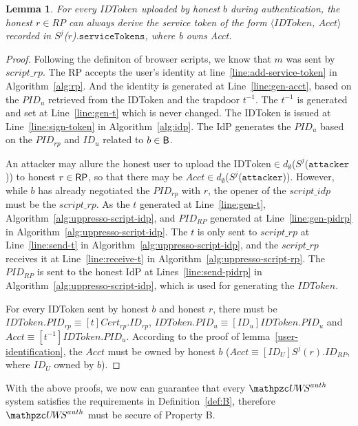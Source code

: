 \documentclass[letterpaper,onecolumn,10pt]{article}
\newtheorem{lemma}{Lemma}
\begin{document}
\begin{lemma}
For every $IDToken$ uploaded by honest $b$ during authentication, the honest $r \in RP$ can always derive the service token of the form $\langle IDToken$, $Acct \rangle$ recorded in $S^j$($r$).$\mathtt{serviceTokens}$, where b owns Acct. 
\end{lemma}
\begin{proof}
  Following the definiton of browser scripts, we know that $m$ was sent by $script\_rp$. 
  The RP accepts the user's identity at line~\ref{line:add-service-token} in Algorithm~\ref{alg:rp}.
  And the identity is generated at Line~\ref{line:gen-acct}, based on the $PID_u$ retrieved 
  from the IDToken and the trapdoor $t^{-1}$. The $t^{-1}$ is generated and set at 
  Line~\ref{line:gen-t} which is never changed. 
  The IDToken is issued at Line~\ref{line:sign-token} in Algorithm~\ref{alg:idp}.
  The IdP generates the $PID_u$ based on the $PID_{rp}$ and $ID_u$ related to $b \in \mathsf{B}$.

  An attacker may allure the honest user to upload the $\text{IDToken} \in d_{\emptyset}$($S^j$($\mathtt{attacker}$)) 
  to honest $r\in\mathsf{RP}$, so that there may be $Acct \in d_{\emptyset}$($S^j$($\mathtt{attacker}$)).
  However, while $b$ has already negotiated the $PID_{rp}$ with $r$, the opener of 
  the $script\_idp$ must be the $script\_rp$. As the $t$ generated at Line~\ref{line:gen-t}, 
  Algorithm~\ref{alg:uppresso-script-idp}, and $PID_{RP}$ generated at Line~\ref{line:gen-pidrp} 
  in Algorithm~\ref{alg:uppresso-script-idp}.
  The $t$ is only sent to $script\_rp$ at Line~\ref{line:send-t} in 
  Algorithm~\ref{alg:uppresso-script-idp}, 
  and the $script\_rp$ receives it at Line~\ref{line:receive-t} in 
  Algorithm~\ref{alg:uppresso-script-rp}.
  The $PID_{RP}$ is sent to the honest IdP at Lines~\ref{line:send-pidrp} in 
  Algorithm~\ref{alg:uppresso-script-idp},  which is used for generating the $IDToken$.

  For every IDToken sent by honest $b$ and honest $r$, there must be 
  $IDToken.PID_{rp} \equiv [t]Cert_{rp}.ID_{rp}$, 
  $IDToken.PID_u \equiv [ID_u]IDToken.PID_u$ and 
  $Acct \equiv [t^{-1}]IDToken.PID_u$. 
  According to the proof of lemma~\ref{user-identification}, 
  the $Acct$ must be owned by honest $b$ ($Acct \equiv [ID_U]S^j(r).ID_{RP}$, 
  where $ID_U$ owned by $b$).
\end{proof}

With the above proofs, we now can guarantee that every $\uppressoauthwebsystem$ system satisfies the requirements in Definition~\ref{def:B}, therefore $\uppressoauthwebsystem$ must be secure of Property B.
\end{document}
